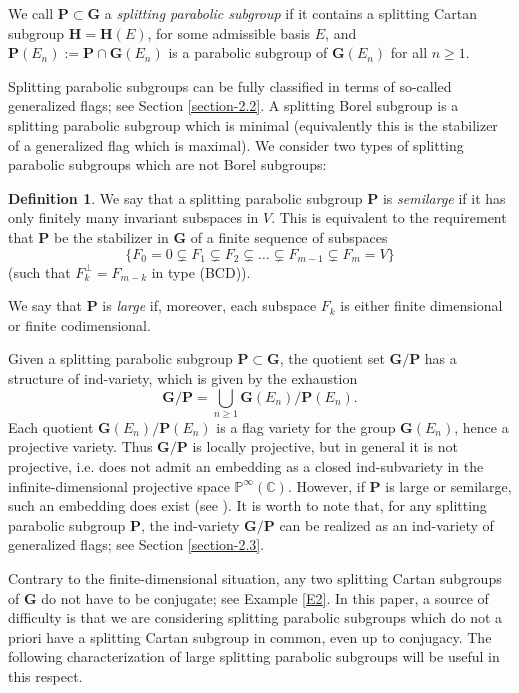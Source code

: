 \documentclass[12pt]{amsart}
\newcommand{\G}{\mathbf{G}}
\renewcommand{\H}{\mathbf{H}}
\renewcommand{\P}{\mathbf{P}}
\newcommand{\C}{\mathbb{C}}
\numberwithin{equation}{section}
\theoremstyle{definition}
\newtheorem{definition}[theorem]{Definition}
\begin{document}
We call $\P\subset\G$ a {\em splitting parabolic subgroup} if it contains a splitting Cartan subgroup $\H=\H(E)$, for some admissible basis $E$, and $\P(E_n):=\P\cap \G(E_n)$ is a parabolic subgroup of $\G(E_n)$ for all $n\geq 1$.

Splitting parabolic subgroups can be fully classified in terms of so-called generalized flags; see Section \ref{section-2.2}. A splitting Borel subgroup is a splitting parabolic subgroup which is minimal (equivalently this is the stabilizer of a generalized flag which is maximal). We consider two types of splitting parabolic subgroups which are not Borel subgroups: 

\begin{definition}
\label{D1}
We say that a splitting parabolic subgroup $\P$ is {\em semilarge} if it has only finitely many invariant subspaces in $V$. This is equivalent to the requirement that $\P$ be the stabilizer in $\G$ of a finite sequence of subspaces
\[
\{F_0=0\subsetneq F_1\subsetneq F_2\subsetneq\ldots\subsetneq F_{m-1}\subsetneq F_m=V\}
\]
(such that $F_k^\perp=F_{m-k}$ in type (BCD)).

We say that $\P$ is {\em large} if, moreover, each subspace $F_k$ is either finite dimensional or finite codimensional.
\end{definition}

Given a splitting parabolic subgroup $\P\subset\G$, the quotient set $\G/\P$ has a structure of ind-variety, which is given by the exhaustion
\[
\G/\P=\bigcup_{n\geq 1}\G(E_n)/\P(E_n).
\]
Each quotient $\G(E_n)/\P(E_n)$ is a flag variety for the group $\G(E_n)$, hence a projective variety. Thus $\G/\P$ is locally projective, but in general it is not projective, i.e. does not admit an embedding as a closed ind-subvariety in the infinite-dimensional projective space $\mathbb{P}^\infty(\C)$. However, if $\P$ is large or semilarge, such an embedding does exist (see \cite[Proposition 7.2]{Dimitrov-Penkov}). It is worth to note that, for any splitting parabolic subgroup $\P$, the ind-variety $\G/\P$ can be realized as an ind-variety of generalized flags; see Section \ref{section-2.3}.

Contrary to the finite-dimensional situation, any two splitting Cartan subgroups of $\G$ do not have to be conjugate;
see Example \ref{E2}. In this paper, a source of difficulty is that we are considering splitting parabolic subgroups which do not a priori have a splitting Cartan subgroup in common, even up to conjugacy. The following characterization of large splitting parabolic subgroups will be useful in this respect.
\end{document}

